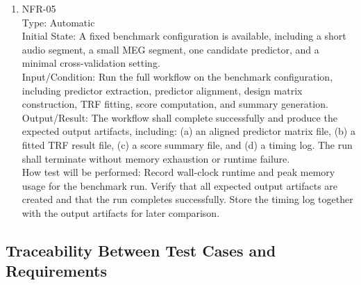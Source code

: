 \documentclass[12pt, titlepage]{article}
\begin{document}
\begin{enumerate}

\item{NFR-05\\}
Type: Automatic \\
Initial State: A fixed benchmark configuration is available, including a short audio segment, a small MEG segment, one candidate predictor, and a minimal cross-validation setting. \\
Input/Condition: Run the full workflow on the benchmark configuration,
including predictor extraction, predictor alignment, design matrix
construction, TRF fitting, score computation, and summary generation. \\
Output/Result: The workflow shall complete successfully and produce the
expected output artifacts, including:
(a) an aligned predictor matrix file,
(b) a fitted TRF result file,
(c) a score summary file, and
(d) a timing log.
The run shall terminate without memory exhaustion or runtime failure. \\
How test will be performed: Record wall-clock runtime and peak memory usage
for the benchmark run. Verify that all expected output artifacts are created and that the run completes successfully. Store the timing log together with the output artifacts for later comparison.

\end{enumerate}



















\subsection{Traceability Between Test Cases and Requirements}

\end{document}
